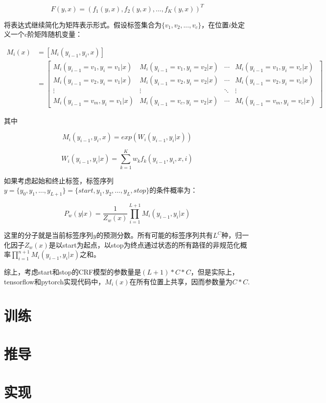\documentclass[]{article}
\begin{document}
\begin{equation}\label{key}
	F(y, x) = (f_1(y, x), f_2(y, x), ..., f_K(y, x))^T
\end{equation}

将表达式继续简化为矩阵表示形式。假设标签集合为$\{v_1, v_2, ..., v_c\}$，在位置$i$处定义一个$c$阶矩阵随机变量：

\begin{align*}		
	M_i(x) &= [M_i(y_{i-1}, y_i, x)] \\
		&= \begin{bmatrix}
		M_i(y_{i-1}=v_1, y_i=v_1|x) & M_i(y_{i-1}=v_1, y_i=v_2|x) & \cdots & M_i(y_{i-1}=v_1, y_i=v_c|x)\\
		M_i(y_{i-1}=v_2, y_i=v_1|x) & M_i(y_{i-1}=v_2, y_i=v_2|x) & \cdots & M_i(y_{i-1}=v_2, y_i=v_c|x)\\
		\vdots & \vdots & \ddots & \vdots\\
		M_i(y_{i-1}=v_m, y_i=v_1|x) & M_i(y_{i-1}=v_c, y_i=v_2|x) & \cdots & M_i(y_{i-1}=v_m, y_i=v_c|x)
	\end{bmatrix}
\end{align*}

其中

\begin{equation}\label{key}
	M_i(y_{i-1}, y_i, x) = exp(W_i(y_{i-1}, y_i|x))
\end{equation}

\begin{equation}\label{key}
	W_i(y_{i-1}, y_i|x) = \sum_{k=1}^K w_kf_k(y_{i-1}, y_i, x, i)
\end{equation}

如果考虑起始和终止标签，标签序列$y=\{y_0, y_1, ..., y_{L+1}\} = \{start, y_1, y_2, ..., y_L, stop\}$的条件概率为：

\begin{equation}\label{key}
	P_w(y|x) = \frac{1}{Z_w(x)}\prod_{i=1}^{L+1} M_i(y_{i-1}, y_i|x)
\end{equation}

这里的分子就是当前标签序列$y$的预测分数。所有可能的标签序列共有$L^C$种，归一化因子$Z_w(x)$是以start为起点，以stop为终点通过状态的所有路径的非规范化概率$\prod_{i=1}^{n+1} M_i(y_{i-1}, y_i|x)$之和。

综上，考虑start和stop的CRF模型的参数量是$(L+1)*C*C$，但是实际上，tensorflow和pytorch实现代码中，$M_i(x)$在所有位置上共享，因而参数量为$C*C$.

\section{训练}

\section{推导}

\section{实现}



\end{document}
